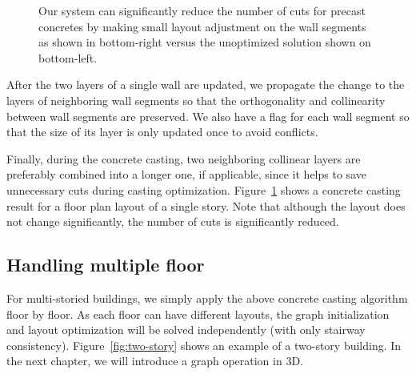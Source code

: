 \begin{figure}[t!]
\centering
{}
\caption[The reduction of concrete cuts.]{Our system can significantly reduce the number of cuts for precast concretes by making small layout adjustment on the wall segments as shown in bottom-right versus the unoptimized solution shown on bottom-left.}
\label{precast}
\end{figure}

After the two layers of a single wall are updated, we propagate the change to the layers of neighboring wall segments so that the orthogonality and collinearity between wall segments are preserved. We also have a flag for each wall segment so that the size of its layer is only updated once to avoid conflicts.

Finally, during the concrete casting, two neighboring collinear layers are preferably combined into a longer one, if applicable, since it helps to save unnecessary cuts during casting optimization. Figure~\ref{precast} shows a concrete casting result for a floor plan layout of a single story. Note that although the layout does not change significantly, the number of cuts is significantly reduced.

\subsection{Handling multiple floor}

For multi-storied buildings, we simply apply the above concrete casting algorithm floor by floor. As each floor can have different layouts, the graph initialization and layout optimization will be solved independently (with only stairway consistency). Figure~\ref{fig:two-story} shows an example of a two-story building. In the next chapter, we will introduce a graph operation in 3D.

